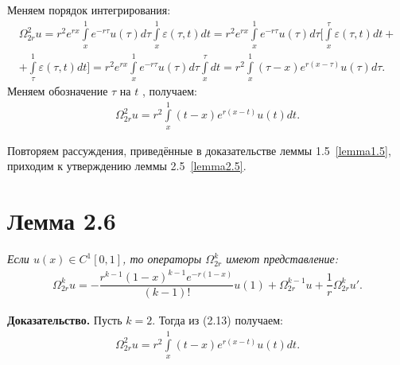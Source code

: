 Меняем порядок интегрирования:
\begin{equation}
\begin{array}{c}
\nonumber

\Omega_{2r}^2u = r^2e^{rx} \int\limits_x^1 e^{-r\tau}u(\tau)d\tau \int\limits_x^1 \varepsilon (\tau ,t) dt = r^2e^{rx} \int\limits_x^1 e^{-r\tau}u(\tau)d\tau \biggl[ \int\limits_x^{\tau} \varepsilon (\tau ,t)dt + \\ + \int\limits_{\tau}^1 \varepsilon (\tau ,t)dt \biggr] = r^2e^{rx} \int\limits_x^1 e^{-r\tau}u(\tau)d\tau \int\limits_x^{\tau}dt = r^2 \int\limits_x^1(\tau - x)e^{r(x-\tau)}u(\tau)d\tau .

\end{array}
\end{equation}
Меняем обозначение $ \tau $ на $ t $ , получаем:
\begin{equation}
\begin{array}{c}
\nonumber

\Omega_{2r}^2u = r^2\int\limits_x^1 (t-x)e^{r(x-t)}u(t)dt.

\end{array}
\end{equation}

Повторяем рассуждения, приведённые в доказательстве леммы 1.5~\eqref{lemma1.5}, приходим к утверждению леммы 2.5~\eqref{lemma2.5}.

\section{Лемма 2.6}
\label{lemma2.6}
\textit{Если $ u(x) \in C^1[0,1] $, то операторы $ \Omega_{2r}^k $ имеют представление:}
\begin{equation}
\begin{array}{c}

\Omega_{2r}^ku = -\dfrac{r^{k-1}(1-x)^{k-1}e^{-r(1-x)}}{(k-1)!}u(1) + \Omega_{2r}^{k-1}u + \dfrac{1}{r}\Omega_{2r}^ku'.

\end{array}
\end{equation}

\textbf{Доказательство.} Пусть $ k = 2 $. Тогда из (2.13) получаем:
\begin{equation}
\begin{array}{c}
\nonumber

\Omega_{2r}^2u = r^2\int\limits_x^1 (t-x)e^{r(x-t)}u(t)dt.

\end{array}
\end{equation}


